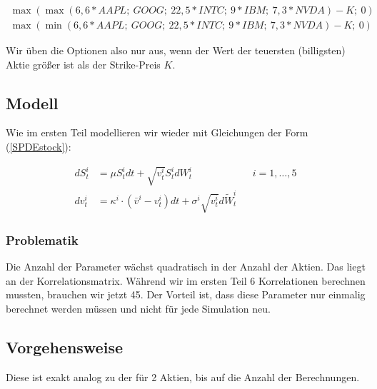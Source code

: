 \documentclass[12pt]{article}
\begin{document}
\begin{align*}
\max(\max(6,6\ast AAPL;\ GOOG;\ 22,5\ast INTC;\ 9\ast IBM;\ 7,3\ast NVDA) -K;\ 0) \\
\max(\min(6,6\ast AAPL;\ GOOG;\ 22,5\ast INTC;\ 9\ast IBM;\ 7,3\ast NVDA) -K;\ 0)
\end{align*}

Wir üben die Optionen also nur aus, wenn der Wert der teuersten (billigsten) Aktie größer ist als der Strike-Preis $K$.


\subsection{Modell}

Wie im ersten Teil modellieren wir wieder mit Gleichungen der Form (\ref{SPDEstock}):

\begin{align*}
dS^i_t &= \mu S^i_t dt + \sqrt{v^i_t} S^i_t dW^i_t  && i=1,\dots,5\\
dv^i_t &= \kappa^i\cdot(\bar{v}^i-v^i_t) dt + \sigma^i \sqrt{v^i_t}d\tilde{W}^i_t
\end{align*}

\subsubsection{Problematik}

Die Anzahl der Parameter wächst quadratisch in der Anzahl der Aktien. Das liegt an der Korrelationsmatrix. Während wir im ersten Teil 6 Korrelationen berechnen mussten, brauchen wir jetzt 45. Der Vorteil ist, dass diese Parameter nur einmalig berechnet werden müssen und nicht für jede Simulation neu.


\subsection{Vorgehensweise}

Diese ist exakt analog zu der für 2 Aktien, bis auf die Anzahl der Berechnungen.
\end{document}
